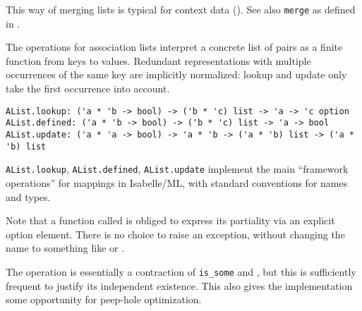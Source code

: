 \begin{isabellebody}
\begin{isamarkuptext}
  This way of merging lists is typical for context data
  ().  See also \verb|merge| as defined in
  \hyperlink{file.~~/src/Pure/library.ML}{\mbox{}}.%
\end{isamarkuptext}%
\isamarkuptrue%
%
\isamarkuptrue%
%
\begin{isamarkuptext}%
The operations for association lists interpret a concrete list
  of pairs as a finite function from keys to values.  Redundant
  representations with multiple occurrences of the same key are
  implicitly normalized: lookup and update only take the first
  occurrence into account.%
\end{isamarkuptext}%
\isamarkuptrue%
%
\begin{isamarkuptext}%
\begin{mldecls}
  \verb|AList.lookup: ('a * 'b -> bool) -> ('b * 'c) list -> 'a -> 'c option| \\
  \verb|AList.defined: ('a * 'b -> bool) -> ('b * 'c) list -> 'a -> bool| \\
  \verb|AList.update: ('a * 'a -> bool) -> 'a * 'b -> ('a * 'b) list -> ('a * 'b) list| \\
  \end{mldecls}

  \begin{description}

  \item \verb|AList.lookup|, \verb|AList.defined|, \verb|AList.update|
  implement the main ``framework operations'' for mappings in
  Isabelle/ML, with standard conventions for names and types.

  Note that a function called  is obliged to express its
  partiality via an explicit option element.  There is no choice to
  raise an exception, without changing the name to something like
   or .

  The  operation is essentially a contraction of \verb|is_some| and , but this is sufficiently frequent to
  justify its independent existence.  This also gives the
  implementation some opportunity for peep-hole optimization.

  \end{description}


\end{isamarkuptext}
\end{isabellebody}
